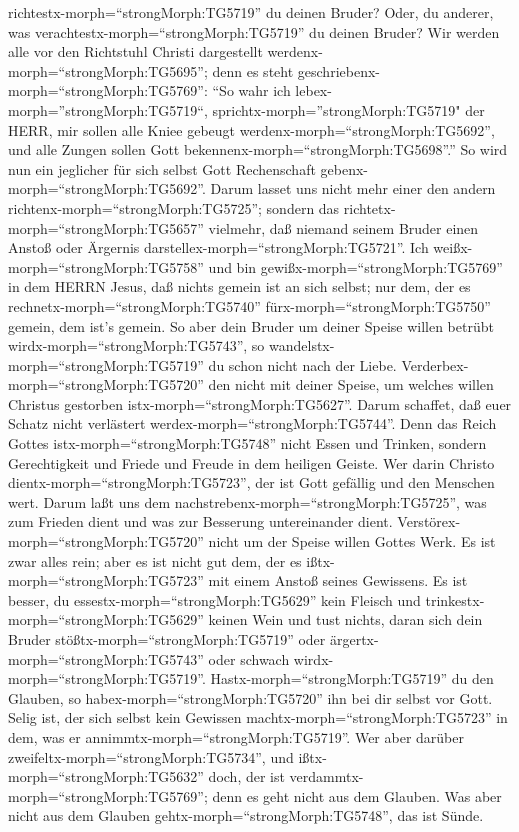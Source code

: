 richtestx-morph=``strongMorph:TG5719'' du deinen Bruder? Oder, du
anderer, was verachtestx-morph=``strongMorph:TG5719'' du deinen Bruder?
Wir werden alle vor den Richtstuhl Christi dargestellt
werdenx-morph=``strongMorph:TG5695'';  denn es steht
geschriebenx-morph=``strongMorph:TG5769'': ``So wahr ich
lebex-morph=''strongMorph:TG5719``, sprichtx-morph=''strongMorph:TG5719"
der HERR, mir sollen alle Kniee gebeugt
werdenx-morph=``strongMorph:TG5692'', und alle Zungen sollen Gott
bekennenx-morph=``strongMorph:TG5698''.''  So wird nun ein
jeglicher für sich selbst Gott Rechenschaft
gebenx-morph=``strongMorph:TG5692''.  Darum lasset uns
nicht mehr einer den andern richtenx-morph=``strongMorph:TG5725'';
sondern das richtetx-morph=``strongMorph:TG5657'' vielmehr, daß niemand
seinem Bruder einen Anstoß oder Ärgernis
darstellex-morph=``strongMorph:TG5721''.  Ich
weißx-morph=``strongMorph:TG5758'' und bin
gewißx-morph=``strongMorph:TG5769'' in dem HERRN Jesus, daß nichts
gemein ist an sich selbst; nur dem, der es
rechnetx-morph=``strongMorph:TG5740'' fürx-morph=``strongMorph:TG5750''
gemein, dem ist's gemein.  So aber dein Bruder um deiner
Speise willen betrübt wirdx-morph=``strongMorph:TG5743'', so
wandelstx-morph=``strongMorph:TG5719'' du schon nicht nach der Liebe.
Verderbex-morph=``strongMorph:TG5720'' den nicht mit deiner Speise, um
welches willen Christus gestorben istx-morph=``strongMorph:TG5627''.
 Darum schaffet, daß euer Schatz nicht verlästert
werdex-morph=``strongMorph:TG5744''.  Denn das Reich Gottes
istx-morph=``strongMorph:TG5748'' nicht Essen und Trinken, sondern
Gerechtigkeit und Friede und Freude in dem heiligen Geiste.
 Wer darin Christo dientx-morph=``strongMorph:TG5723'', der
ist Gott gefällig und den Menschen wert.  Darum laßt uns
dem nachstrebenx-morph=``strongMorph:TG5725'', was zum Frieden dient und
was zur Besserung untereinander dient. 
Verstörex-morph=``strongMorph:TG5720'' nicht um der Speise willen Gottes
Werk. Es ist zwar alles rein; aber es ist nicht gut dem, der es
ißtx-morph=``strongMorph:TG5723'' mit einem Anstoß seines Gewissens.
 Es ist besser, du essestx-morph=``strongMorph:TG5629''
kein Fleisch und trinkestx-morph=``strongMorph:TG5629'' keinen Wein und
tust nichts, daran sich dein Bruder stößtx-morph=``strongMorph:TG5719''
oder ärgertx-morph=``strongMorph:TG5743'' oder schwach
wirdx-morph=``strongMorph:TG5719''. 
Hastx-morph=``strongMorph:TG5719'' du den Glauben, so
habex-morph=``strongMorph:TG5720'' ihn bei dir selbst vor Gott. Selig
ist, der sich selbst kein Gewissen machtx-morph=``strongMorph:TG5723''
in dem, was er annimmtx-morph=``strongMorph:TG5719''.  Wer
aber darüber zweifeltx-morph=``strongMorph:TG5734'', und
ißtx-morph=``strongMorph:TG5632'' doch, der ist
verdammtx-morph=``strongMorph:TG5769''; denn es geht nicht aus dem
Glauben. Was aber nicht aus dem Glauben
gehtx-morph=``strongMorph:TG5748'', das ist Sünde.

